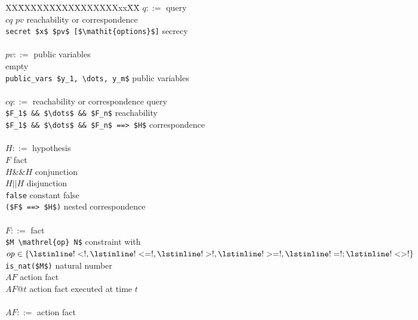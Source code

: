 \documentclass{book}
\begin{document}
%
\begin{figure}[ht]
\begin{center}
\begin{minipage}{\linewidth}
\begin{tabbing}
   XX\=XXXXXXXXXXXXXXXXxx\=XX\=\kill     %
$q ::=$\>   \> query\\
\> $cq$ $pv$ \> reachability or correspondence\\
\> \lstinline!secret $x$ $pv$ [$\mathit{options}$]!          \>\> secrecy\\
\\
$pv ::=$\>   \> public variables\\
\> \>\> empty\\
\> \lstinline!public_vars $y_1, \dots, y_m$!\>\> public variables\\
\\
$cq ::=$ \>						\> reachability or correspondence query		\\
\> \lstinline!$F_1$ && $\dots$ && $F_n$!		\>\> reachability\\
\> \lstinline!$F_1$ && $\dots$ && $F_n$ ==> $H$!	\>\> correspondence \\
\\
$H ::=$ \>						\> hypothesis		\\
\> $F$							\>\> fact		\\
\> $H \mathrel{\&\&} H$					\>\> conjunction 	\\
\> $H \mathrel{||} H$					\>\> disjunction 	\\
\> \lstinline!false!                                    \>\> constant false     \\
\> \lstinline!($F$ ==> $H$)!				\>\> nested correspondence	\\
\\
$F ::=$ \>						\> fact 		\\
\> \lstinline!$M \mathrel{op} N$!                       \>\> constraint with $op \in \{ \lstinline!<!, \lstinline!<=!, \lstinline!>!, \lstinline!>=!, \lstinline!=!; \lstinline!<>!\}$\\
\> \lstinline!is_nat($M$)!                              \>\> natural number\\
\> $AF$                                                 \>\> action fact\\
\> $AF$@$t$						\>\> action fact executed at time $t$\\
\\
$AF ::=$\>                                              \> action fact\\

\end{tabbing}
\end{minipage}
\end{center}
\end{figure}
\end{document}
